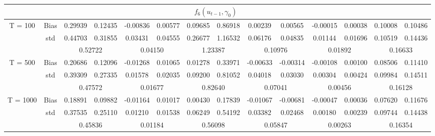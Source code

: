 \documentclass[a4paper,12pt,times,numbered,print,index]{report}
\numberwithin{equation}{section}
\begin{document}
\begin{table}[htbp]
\begin{adjustbox}{max width=\textwidth}
\begin{tabular}{cccccccccccccc}
    \midrule
    &       & \multicolumn{10}{c}{$f_6 (u_{t-1}, \gamma_0)$}                \\
    \midrule
    \multirow{3}[1]{*}{T = 100} & Bias  & 0.29939 & 0.12435 & -0.00836 & 0.00577 & 0.09685 & 0.86918 & 0.00239 & 0.00565 & -0.00015 & 0.00038 & 0.10008 & 0.10486 \\
          & std   & 0.44703 & 0.31855 & 0.03431 & 0.04555 & 0.26677 & 1.16532 & 0.06176 & 0.04835 & 0.01144 & 0.01696 & 0.10519 & 0.14436 \\
          &       & \multicolumn{2}{c}{0.52722} & \multicolumn{2}{c}{0.04150} & \multicolumn{2}{c}{1.23387} & \multicolumn{2}{c}{0.10976} & \multicolumn{2}{c}{0.01892} & \multicolumn{2}{c}{0.16633} \\
    \multirow{3}[0]{*}{T = 500} & Bias  & 0.20686 & 0.12096 & -0.01268 & 0.01065 & 0.01278 & 0.33971 & -0.00633 & -0.00314 & -0.00108 & 0.00100 & 0.08506 & 0.11410 \\
          & std   & 0.39309 & 0.27335 & 0.01578 & 0.02035 & 0.09200 & 0.81052 & 0.04018 & 0.03030 & 0.00304 & 0.00424 & 0.09984 & 0.14511 \\
          &       & \multicolumn{2}{c}{0.47572} & \multicolumn{2}{c}{0.01677} & \multicolumn{2}{c}{0.82640} & \multicolumn{2}{c}{0.07041} & \multicolumn{2}{c}{0.00456} & \multicolumn{2}{c}{0.16128} \\
    \multirow{3}[1]{*}{T = 1000} & Bias  & 0.18891 & 0.09882 & -0.01164 & 0.01017 & 0.00430 & 0.17839 & -0.01067 & -0.00681 & -0.00047 & 0.00036 & 0.07620 & 0.11676 \\
          & std   & 0.37535 & 0.25110 & 0.01210 & 0.01538 & 0.06249 & 0.54192 & 0.03382 & 0.02468 & 0.00180 & 0.00239 & 0.09744 & 0.14438 \\
          &       & \multicolumn{2}{c}{0.45836} & \multicolumn{2}{c}{0.01184} & \multicolumn{2}{c}{0.56098} & \multicolumn{2}{c}{0.05847} & \multicolumn{2}{c}{0.00263} & \multicolumn{2}{c}{0.16354} \\
    \bottomrule
    \bottomrule
    \end{tabular}%
    \end{adjustbox}
  \label{s_f56}%
\end{table}%
\end{document}
